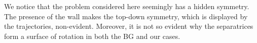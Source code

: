 
We notice that the problem considered here seemingly has a hidden symmetry. The presence of the wall makes the top-down symmetry, which is displayed by the trajectories, non-evident. Moreover, it is not so evident why the separatrices form a surface of rotation in both the BG and our cases.

